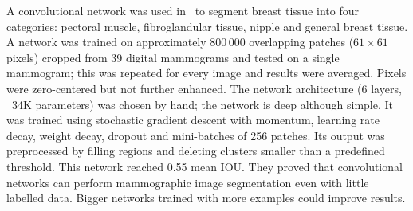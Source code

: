 \begin{comment}
- trained with patches, tested with fully convnet
- Tissue segmentation (not lesion segmentation): pectoral muscle, fibroglandular tissue, nipple, and general breast tissue and background.
- data set 40(!) digital(!) mammograms
- no enhancement
- convnet produces 4-d score vectors (for each class)
- small 61x61 input images
- global zero-mean (substract the mean of all intensity values) (not so necessary). 
- cross-entropy loss
- by overlapping, they get 8x10^5 training patches
- overlapping pooling
- they do not use zero-padding,
- 829 x 640 original image dimensions
- train on 39 images, test on 1 LOOCV
- shift-and-stitch method (no upsampling)
- post-processing: regions are filled, and clusters less than a threshold are deleted (threshold is set arbitrarily)
- SGD with momentum
- mini-batches of 256 image patches, learning rate = 0.001, learning rate was reduced by a factor of 10 after 10 and 20 epochs, momentum 0.9, weight decay 0.0005
Dropout removed during testing.
- changing from patch normalization to global normalization had minor effects (on classfication, not in learning, learning was done with normalized patches).
\end{comment}
A convolutional network was used in~\cite{Dubrovina2015} to segment breast tissue into four categories: pectoral muscle, fibroglandular tissue, nipple and general breast tissue. A network was trained on approximately 800\,000 overlapping patches ($61\times61$ pixels) cropped from 39 digital mammograms and tested on a single mammogram; this was repeated for every image and results were averaged. Pixels were zero-centered but not further enhanced. The network architecture (6 layers, ~34K parameters) was chosen by hand; the network is deep although simple. It was trained using stochastic gradient descent with momentum, learning rate decay, weight decay, dropout and mini-batches of 256 patches. Its output was preprocessed by filling regions and deleting clusters smaller than a predefined threshold.
This network reached 0.55 mean IOU. They proved that convolutional networks can perform mammographic image segmentation even with little labelled data. Bigger networks trained with more examples could improve results.

